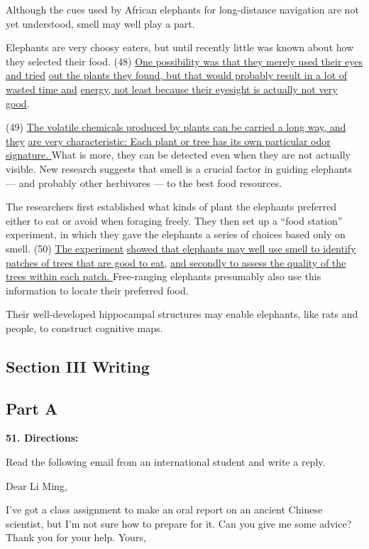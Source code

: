\documentclass[UTF8,11pt]{ctexart}
\begin{document}
Although the cues used by African elephants for long-distance navigation are not yet understood, smell may well play a part.


Elephants are very choosy eaters, but until recently little was known about how they selected their food. (48) \uline{One possibility was that they merely used their eyes and tried} \uline{out the plants they found, but that would probably result in a lot of wasted time and} \uline{energy, not least because their eyesight is actually not very good}.


(49) \uline{The volatile chemicals produced by plants can be carried a long way, and they} \uline{are very characteristic: Each plant or tree has its own particular odor signature. }What is more, they can be detected even when they are not actually visible. New research suggests that smell is a crucial factor in guiding elephants — and probably other herbivores — to the best food resources.


The researchers first established what kinds of plant the elephants preferred either to eat or avoid when foraging freely. They then set up a “food station” experiment, in which they gave the elephants a series of choices based only on smell. (50) \uline{The experiment} \uline{showed that elephants may well use smell to identify patches of trees that are good to eat,} \uline{and secondly to assess the quality of the trees within each patch. }Free-ranging elephants presumably also use this information to locate their preferred food.


Their well-developed hippocampal structures may enable elephants, like rats and people, to construct cognitive maps.


\subsection*{\textbf{Section III Writing}}


\subsection*{\textbf{Part A}}


\textbf{51. Directions:}


Read the following email from an international student and write a reply.


Dear Li Ming,


I’ve got a class assignment to make an oral report on an ancient Chinese scientist, but I’m not sure how to prepare for it. Can you give me some advice? Thank you for your help. Yours,
\end{document}
